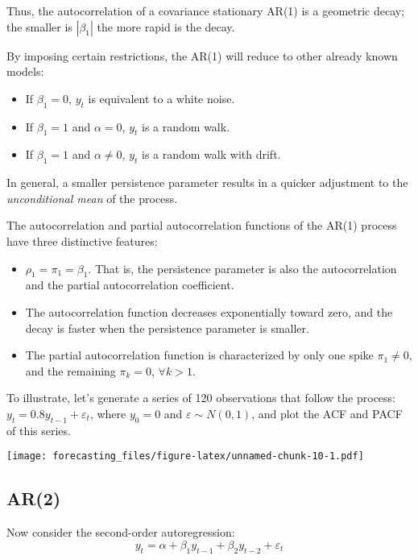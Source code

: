 \documentclass[
  oneside]{book}
\providecommand{\tightlist}{%
  \setlength{\itemsep}{0pt}\setlength{\parskip}{0pt}}
\begin{document}
Thus, the autocorrelation of a covariance stationary AR(1) is a geometric decay; the smaller is \(|\beta_1|\) the more rapid is the decay.

By imposing certain restrictions, the AR(1) will reduce to other already known models:

\begin{itemize}
\tightlist
\item
  If \(\beta_1 = 0\), \(y_t\) is equivalent to a white noise.
\item
  If \(\beta_1 = 1\) and \(\alpha = 0\), \(y_t\) is a random walk.
\item
  If \(\beta_1 = 1\) and \(\alpha \neq 0\), \(y_t\) is a random walk with drift.
\end{itemize}

In general, a smaller persistence parameter results in a quicker adjustment to the \emph{unconditional mean} of the process.

The autocorrelation and partial autocorrelation functions of the AR(1) process have three distinctive features:

\begin{itemize}
\tightlist
\item
  \(\rho_1 = \pi_1 = \beta_1\). That is, the persistence parameter is also the autocorrelation and the partial autocorrelation coefficient.
\item
  The autocorrelation function decreases exponentially toward zero, and the decay is faster when the persistence parameter is smaller.
\item
  The partial autocorrelation function is characterized by only one spike \(\pi_1 \neq 0\), and the remaining \(\pi_k = 0\), \(\forall k > 1\).
\end{itemize}

To illustrate, let's generate a series of 120 observations that follow the process: \(y_t=0.8y_{t-1}+\varepsilon_t\), where \(y_0=0\) and \(\varepsilon\sim N(0,1)\), and plot the ACF and PACF of this series.

\texttt{[image: forecasting\_files/figure-latex/unnamed-chunk-10-1.pdf]}

\hypertarget{ar2}{%
\subsection{AR(2)}\label{ar2}}

Now consider the second-order autoregression: \[y_t = \alpha + \beta_1 y_{t-1} + \beta_2 y_{t-2} + \varepsilon_t\]
\end{document}
